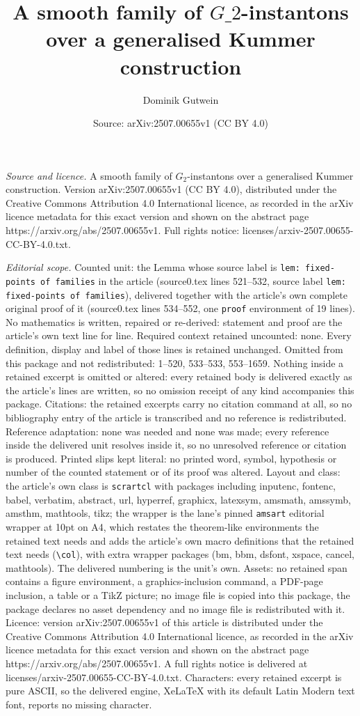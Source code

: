 \documentclass[10pt,a4paper]{amsart}
\title[A smooth family of $G\_2$-instantons over a generalised Kumme]{A smooth family of $G\_2$-instantons over a generalised Kummer construction}
\author{Dominik Gutwein}
\date{Source: arXiv:2507.00655v1 (CC BY 4.0)}
\begin{document}
\maketitle

\noindent\emph{Source and licence.} A smooth family of $G_2$-instantons over a generalised Kummer construction. Version arXiv:2507.00655v1 (CC BY 4.0), distributed under the Creative Commons Attribution 4.0 International licence, as recorded in the arXiv licence metadata for this exact version and shown on the abstract page https://arxiv.org/abs/2507.00655v1. Full rights notice: licenses/arxiv-2507.00655-CC-BY-4.0.txt.\par\smallskip

\noindent\textit{Editorial scope.} Counted unit: the Lemma whose source label is \texttt{lem: fixed-points of families} in the article (source0.tex lines 521--532, source label \texttt{lem: fixed-points of families}), delivered together with the article's own complete original proof of it (source0.tex lines 534--552, one \texttt{proof} environment of 19 lines). No mathematics is written, repaired or re-derived: statement and proof are the article's own text line for line. Required context retained uncounted: none. Every definition, display and label of those lines is retained unchanged. Omitted from this package and not redistributed: 1--520, 533--533, 553--1659. Nothing inside a retained excerpt is omitted or altered: every retained body is delivered exactly as the article's lines are written, so no omission receipt of any kind accompanies this package. Citations: the retained excerpts carry no citation command at all, so no bibliography entry of the article is transcribed and no reference is redistributed. Reference adaptation: none was needed and none was made; every reference inside the delivered unit resolves inside it, so no unresolved reference or citation is produced. Printed slips kept literal: no printed word, symbol, hypothesis or number of the counted statement or of its proof was altered. Layout and class: the article's own class is \texttt{scrartcl} with packages including inputenc, fontenc, babel, verbatim, abstract, url, hyperref, graphicx, latexsym, amsmath, amssymb, amsthm, mathtools, tikz; the wrapper is the lane's pinned \texttt{amsart} editorial wrapper at 10pt on A4, which restates the theorem-like environments the retained text needs and adds the article's own macro definitions that the retained text needs (\texttt{\textbackslash col}), with extra wrapper packages (bm, bbm, dsfont, xspace, cancel, mathtools). The delivered numbering is the unit's own. Assets: no retained span contains a figure environment, a graphics-inclusion command, a PDF-page inclusion, a table or a TikZ picture; no image file is copied into this package, the package declares no asset dependency and no image file is redistributed with it. Licence: version arXiv:2507.00655v1 of this article is distributed under the Creative Commons Attribution 4.0 International licence, as recorded in the arXiv licence metadata for this exact version and shown on the abstract page https://arxiv.org/abs/2507.00655v1. A full rights notice is delivered at licenses/arxiv-2507.00655-CC-BY-4.0.txt. Characters: every retained excerpt is pure ASCII, so the delivered engine, XeLaTeX with its default Latin Modern text font, reports no missing character.
\end{document}
